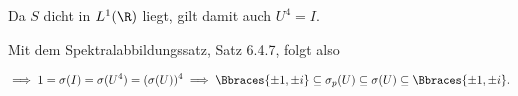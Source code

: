 \begin{solution}
Da $S$ dicht in $L^1(\R)$ liegt, gilt damit auch $U^4 = I$.


Mit dem Spektralabbildungssatz, Satz 6.4.7, folgt also

\begin{align*}
  \implies
  1 = \sigma(I) = \sigma(U^4) = (\sigma(U))^4
  \implies
  \Bbraces{\pm 1, \pm i}
  \subseteq
  \sigma_p(U)
  \subseteq
  \sigma(U)
  \subseteq
  \Bbraces{\pm 1, \pm i}.
\end{align*}

\end{solution}
